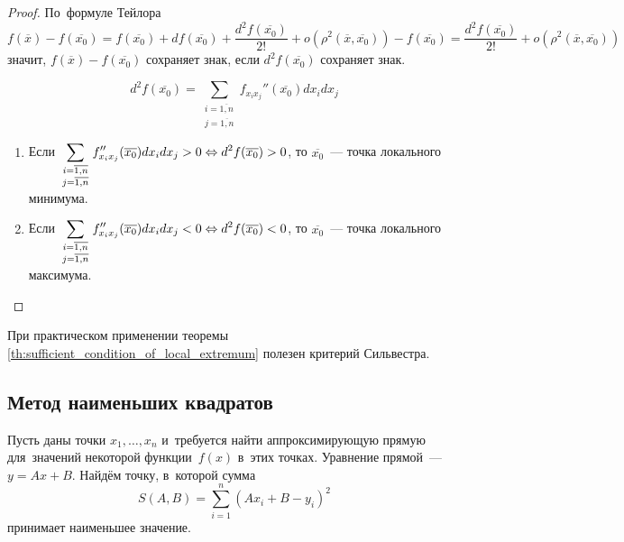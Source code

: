 \begin{proof}
	По~формуле Тейлора
	\[ f(\overline x) - f(\overline{x_0}) =
	f(\overline{x_0}) + df(\overline{x_0}) + \frac{d^2 f(\overline{x_0})}{2!} + o(\rho^2(\overline x, \overline{x_0})) - f(\overline{x_0}) =
	\frac{d^2 f(\overline{x_0})}{2!} + o(\rho^2(\overline x, \overline{x_0})) \]
	значит, $f(\overline x) - f(\overline{x_0})$ сохраняет знак, если $d^2 f(\overline{x_0})$ сохраняет знак.
	
	\[ d^2 f(\overline{x_0}) = \sum_{
\begin{smallmatrix}
	i = \overline{1, n} \\
	j = \overline{1, n}
\end{smallmatrix}
	} f_{x_i x_j}''(\overline{x_0}) dx_i dx_j \]
	
\begin{enumerate}
	\item Если $\displaystyle \sum_{
\begin{smallmatrix}
	i = \overline{1, n} \\
	j = \overline{1, n}
\end{smallmatrix}
	} f_{x_i x_j}''(\overline{x_0}) dx_i dx_j > 0 \opbr\Leftrightarrow
	d^2 f(\overline{x_0}) > 0$, то $\overline{x_0}$~--- точка локального минимума.
	\item Если $\displaystyle \sum_{
\begin{smallmatrix}
	i = \overline{1, n} \\
	j = \overline{1, n}
\end{smallmatrix}
	} f_{x_i x_j}''(\overline{x_0}) dx_i dx_j < 0 \opbr\Leftrightarrow
	d^2 f(\overline{x_0}) < 0$, то $\overline{x_0}$~--- точка локального максимума.
\end{enumerate}
\end{proof}
	
	При практическом применении теоремы \ref{th:sufficient_condition_of_local_extremum} полезен критерий Сильвестра.
	
\subsection{Метод наименьших квадратов}
	Пусть даны точки $x_1, \ldots, x_n$ и~требуется найти аппроксимирующую прямую для~значений некоторой функции~$f(x)$ в~этих точках.
	Уравнение прямой~--- $y = Ax + B$.
	Найдём точку, в~которой сумма
	\[ S(A, B) = \sum_{i=1}^n (A x_i + B - y_i)^2 \]
	принимает наименьшее значение.
	
